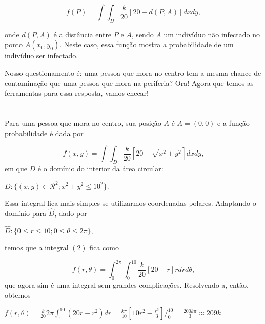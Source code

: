 \documentclass[a4paper]{article}
\begin{document}
\begin{equation}
    f(P)= \int\int_D \frac{k}{20}[20-d(P,A)]dxdy ,
\end{equation}

onde $d(P,A)$ é a distância entre $P$ e $A$, sendo $A$ um indivíduo não infectado no ponto $A(x_0,y_0)$. Neste caso, essa função mostra a probabilidade de um indivíduo ser infectado.\newline

Nosso questionamento é: uma pessoa que mora no centro tem a mesma chance de contaminação que uma pessoa que mora na periferia? Ora! Agora que temos as ferramentas para essa resposta, vamos checar!\newpage

\section{}
Para uma pessoa que mora no centro, sua posição $A$ é $A=(0,0)$ e a função probabilidade é dada por\newline

\begin{equation}
    f(x,y)= \int\int_D \frac{k}{20}[20-\sqrt{x^2+y^2}]dxdy ,
\end{equation}
em que $D$ é o domínio do interior da área circular:\newline

$D:\{ (x,y)\in \mathcal{R}^2 ; x^2+y^2\leq 10^2 \}$.\newline

Essa integral fica mais simples se utilizarmos coordenadas polares. Adaptando o domínio para $\widehat{D}$, dado por\newline

$\widehat{D}:\{ 0\leq r\leq 10; 0\leq \theta \leq 2\pi \}$,\newline

temos que a integral $(2)$ fica como

\begin{equation}
    f(r,\theta)=\int_0^{2\pi}\int_0^{10}\frac{k}{20}[20-r]rdrd\theta,
\end{equation}\newline
que agora sim é uma integral sem grandes complicações.\newline
Resolvendo-a, então, obtemos\newline

$
    f(r,\theta)=\frac{k}{20}2\pi\int_0^{10}(20r-r^2)dr = \frac{k\pi}{10}[10r^2-\frac{r^3}{3}]/_0^{10}=\frac{200k\pi}{3}\approx 209k
$\newline
\end{document}
